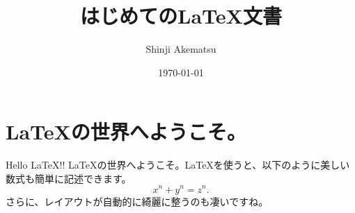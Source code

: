 \documentclass{ltjsbook}
\title{はじめての\LaTeX 文書}
\author{Shinji Akematsu}
\date{\today}
\begin{document}
\maketitle
\tableofcontents
\newpage
\chapter{\LaTeX の世界へようこそ。}
Hello \LaTeX !! \LaTeX の世界へようこそ。\LaTeX を使うと、以下のように美しい数式も簡単に記述できます。
\[x^n + y^n = z^n.\]
さらに、レイアウトが自動的に綺麗に整うのも凄いですね。
\end{document}
